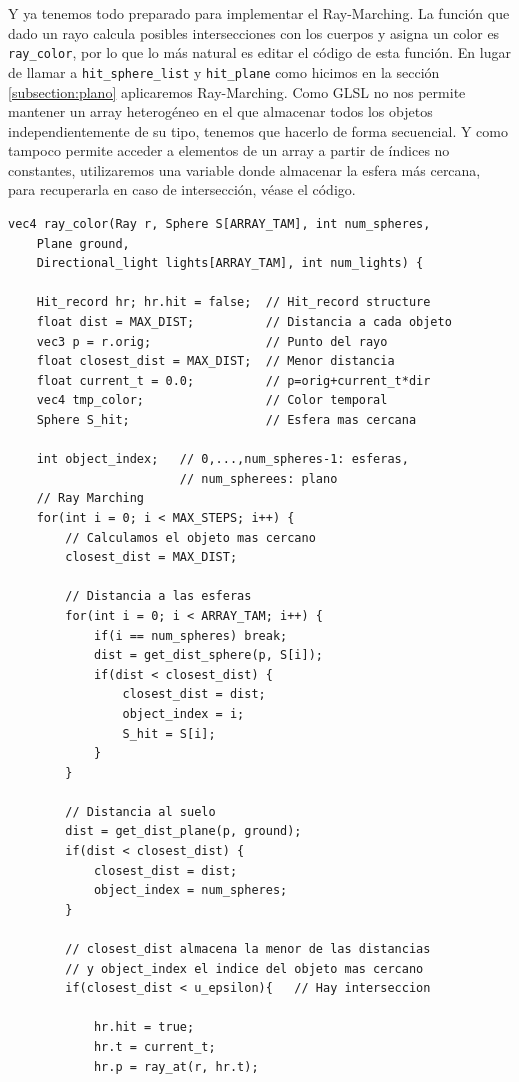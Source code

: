 Y ya tenemos todo preparado para implementar el Ray-Marching. La función que dado un rayo calcula posibles intersecciones con los cuerpos y asigna un color es \verb|ray_color|, por lo que lo más natural es editar el código de esta función. En lugar de llamar a \verb|hit_sphere_list| y \verb|hit_plane| como hicimos en la sección \ref{subsection:plano} aplicaremos Ray-Marching. Como GLSL no nos permite mantener un array heterogéneo en el que almacenar todos los objetos independientemente de su tipo, tenemos que hacerlo de forma secuencial. Y como tampoco permite acceder a elementos de un array a partir de índices no constantes, utilizaremos una variable donde almacenar la esfera más cercana, para recuperarla en caso de intersección, véase el código.

\begin{lstlisting}
vec4 ray_color(Ray r, Sphere S[ARRAY_TAM], int num_spheres, 
    Plane ground,
    Directional_light lights[ARRAY_TAM], int num_lights) {
    
    Hit_record hr; hr.hit = false;  // Hit_record structure
    float dist = MAX_DIST;          // Distancia a cada objeto 
    vec3 p = r.orig;                // Punto del rayo
    float closest_dist = MAX_DIST;  // Menor distancia
    float current_t = 0.0;          // p=orig+current_t*dir
    vec4 tmp_color;                 // Color temporal
    Sphere S_hit;                   // Esfera mas cercana
    
    int object_index;   // 0,...,num_spheres-1: esferas,
                        // num_spherees: plano
    // Ray Marching
    for(int i = 0; i < MAX_STEPS; i++) {
        // Calculamos el objeto mas cercano
        closest_dist = MAX_DIST;

        // Distancia a las esferas
        for(int i = 0; i < ARRAY_TAM; i++) {
            if(i == num_spheres) break;
            dist = get_dist_sphere(p, S[i]);
            if(dist < closest_dist) {
                closest_dist = dist;
                object_index = i;
                S_hit = S[i];
            }
        }

        // Distancia al suelo
        dist = get_dist_plane(p, ground);
        if(dist < closest_dist) {
            closest_dist = dist;
            object_index = num_spheres;
        }
    
        // closest_dist almacena la menor de las distancias
        // y object_index el indice del objeto mas cercano
        if(closest_dist < u_epsilon){   // Hay interseccion

            hr.hit = true;
            hr.t = current_t;
            hr.p = ray_at(r, hr.t);


\end{lstlisting}
